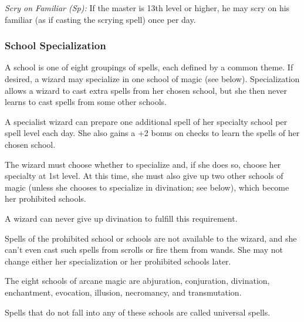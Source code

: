 \textit{Scry on Familiar (Sp):} If the master is 13th level or higher, he may scry on his familiar (as if casting the scrying spell) once per day.

\subsubsection{School Specialization}
A school is one of eight groupings of spells, each defined by a common theme. If desired, a wizard may specialize in one school of magic (see below). Specialization allows a wizard to cast extra spells from her chosen school, but she then never learns to cast spells from some other schools.

A specialist wizard can prepare one additional spell of her specialty school per spell level each day. She also gains a +2 bonus on  checks to learn the spells of her chosen school.

The wizard must choose whether to specialize and, if she does so, choose her specialty at 1st level. At this time, she must also give up two other schools of magic (unless she chooses to specialize in divination; see below), which become her prohibited schools.

A wizard can never give up divination to fulfill this requirement.

Spells of the prohibited school or schools are not available to the wizard, and she can't even cast such spells from scrolls or fire them from wands. She may not change either her specialization or her prohibited schools later.

The eight schools of arcane magic are abjuration, conjuration, divination, enchantment, evocation, illusion, necromancy, and transmutation.

Spells that do not fall into any of these schools are called universal spells.

